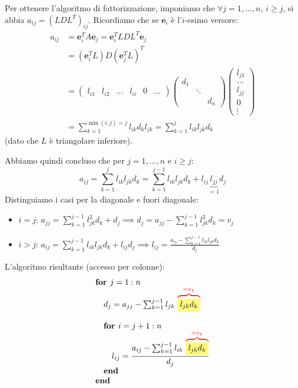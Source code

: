 Per ottenere l'algoritmo di fattorizzazione, imponiamo che $\forall j=1, \dots, n$, $i \ge j$, si abbia $a_{ij} = (LDL^T)_{ij}$.
Ricordiamo che se $\mathbf{e}_i$ è l'$i$-esimo versore:
\begin{align*}
    a_{ij} &= \mathbf{e}_i^T A \mathbf{e}_j = \mathbf{e}_i^T L D L^T \mathbf{e}_j \\
           &= (\mathbf{e}_i^T L) D (\mathbf{e}_j^T L)^T \\
           &= \begin{pmatrix} l_{i1} & l_{i2} & \dots & l_{ii} & 0 & \dots \end{pmatrix} 
              \begin{pmatrix} d_1 & & \\ & \ddots & \\ & & d_n \end{pmatrix}
              \begin{pmatrix} l_{j1} \\ \dots \\ l_{jj} \\ 0 \\ \vdots \end{pmatrix} \\
           &= \sum_{k=1}^{\min(i,j)=j} l_{ik} d_k l_{jk} = \sum_{k=1}^j l_{ik} l_{jk} d_k
\end{align*}
(dato che $L$ è triangolare inferiore).

Abbiamo quindi concluso che per $j=1,\dots,n$ e $i \ge j$:
$$ a_{ij} = \sum_{k=1}^j l_{ik} l_{jk} d_k = \sum_{k=1}^{j-1} l_{ik} l_{jk} d_k + l_{ij} \underbrace{l_{jj}}_{=1} d_j $$
Distinguiamo i casi per la diagonale e fuori diagonale:
\begin{itemize}
    \item $i=j$: $a_{jj} = \sum_{k=1}^{j-1} l_{jk}^2 d_k + d_j \implies d_j = a_{jj} - \sum_{k=1}^{j-1} l_{jk}^2 d_k = v_j$
    \item $i > j$: $a_{ij} = \sum_{k=1}^{j-1} l_{ik} l_{jk} d_k + l_{ij} d_j \implies l_{ij} = \frac{a_{ij} - \sum_{k=1}^{j-1} l_{ik} l_{jk} d_k}{d_j}$
\end{itemize}

L'algoritmo risultante (accesso per colonne):
\[
\begin{array}{l}
    \textbf{for } j = 1:n \\
    \quad d_j = a_{jj} - \sum_{k=1}^{j-1} l_{jk} \, \overbrace{\colorbox{yellow!50}{$l_{jk} d_k$}}^{\color{red}=v_k} \\
    \\
    \quad \textbf{for } i = j+1:n \\
    \qquad l_{ij} = \dfrac{a_{ij} - \sum_{k=1}^{j-1} l_{ik} \, \overbrace{\colorbox{yellow!50}{$l_{jk} d_k$}}^{\color{red}=v_k}}{d_j} \\
    \quad \textbf{end} \\
    \textbf{end}
\end{array}
\]

